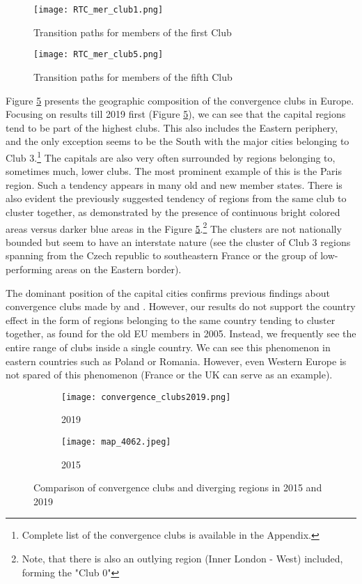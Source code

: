 \documentclass[11pt]{article}
\begin{document}
\begin{figure}[!htbp]%
    \centering
    \texttt{[image: RTC\_mer\_club1.png]}
    \caption{Transition paths for members of the first Club}
    \label{paths1}
\end{figure}

\begin{figure}[!htbp]%
    \centering
    \texttt{[image: RTC\_mer\_club5.png]}
    \caption{Transition paths for members of the fifth Club }
    \label{paths5}
\end{figure}


Figure \ref{clubs_graphic} presents the geographic composition of the convergence clubs in Europe. Focusing on results till 2019 first (Figure \ref{clubs_graphic}), we can see that the capital regions tend to be part of the highest clubs. This also includes the Eastern periphery, and the only exception seems to be the South with the major cities belonging to Club 3.\footnote{Complete list of the convergence clubs is available in the Appendix.} The capitals are also very often surrounded by regions belonging to, sometimes much, lower clubs. The most prominent example of this is the Paris region. Such a tendency appears in many old and new member states. There is also evident the previously suggested tendency of regions from the same club to cluster together, as demonstrated by the presence of continuous bright colored areas versus darker blue areas in the Figure \ref{clubs_graphic}.\footnote{Note, that there is also an outlying region (Inner London - West) included, forming the "Club 0"} The clusters are not nationally bounded but seem to have an interstate nature (see the cluster of Club 3 regions spanning from the Czech republic to southeastern France or the group of low-performing areas on the Eastern border).


The dominant position of the capital cities confirms previous findings about convergence clubs made by \citet{sme2012regional} and \citet{bartkowska2012regional}. However, our results do not support the country effect in the form of regions belonging to the same country tending to cluster together, as \citet{bartkowska2012regional} found for the old EU members in 2005. Instead, we frequently see the entire range of clubs inside a single country. We can see this phenomenon in eastern countries such as Poland or Romania. However,
even Western Europe is not spared of this phenomenon (France or the UK can serve as an example).


\begin{figure}[!htbp]%
\centering
\begin{subfigure}[c]{0.75\linewidth}
  {
  \texttt{[image: convergence\_clubs2019.png]}
    \caption{2019}
    \label{clubs_graphic_2019}
  }
\end{subfigure}
\qquad
\begin{subfigure}[c]{0.75\linewidth}
  \texttt{[image: map\_4062.jpeg]}
  \caption{2015}
  \label{clubs_graphic_2015}
\end{subfigure}
  \caption{Comparison of convergence clubs and diverging regions in 2015 and 2019}
\label{clubs_graphic}
\end{figure} 
\end{document}
